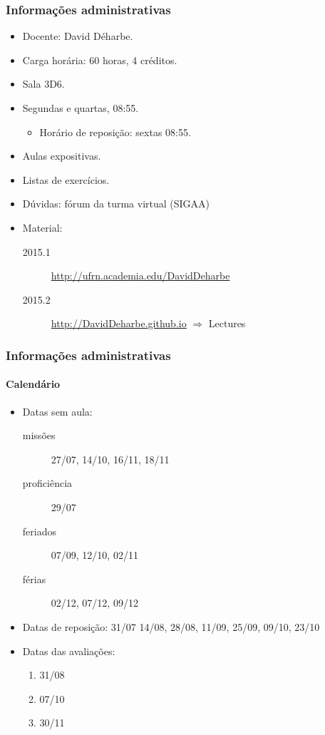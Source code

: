 \documentclass{beamer}
\begin{document}
\begin{frame}

  \frametitle{Informações administrativas}

  \begin{itemize}
    \item Docente: David Déharbe.
    \item Carga horária: 60 horas, 4 créditos.
    \item Sala 3D6.
    \item Segundas e quartas, 08:55. 
      \begin{itemize}
      \item Horário de reposição: sextas 08:55.
      \end{itemize}
    \item Aulas expositivas.
    \item Listas de exercícios.
    \item Dúvidas: fórum da turma virtual (SIGAA)
    \item Material:
      \begin{description}
      \item[2015.1] \url{http://ufrn.academia.edu/DavidDeharbe}
      \item[2015.2] \url{http://DavidDeharbe.github.io} $\Rightarrow$ Lectures
      \end{description}
  \end{itemize}
\end{frame}

\begin{frame}

  \frametitle{Informações administrativas}
  \framesubtitle{Calendário}

  \begin{itemize}

    \item Datas sem aula:
      \begin{description}
        \item[missões] 27/07, 14/10, 16/11, 18/11
        \item[proficiência] 29/07
        \item[feriados] 07/09, 12/10, 02/11
        \item[férias] 02/12, 07/12, 09/12
      \end{description}

    \item Datas de reposição: 31/07 14/08, 28/08, 11/09, 25/09, 09/10, 23/10

    \item Datas das avaliações:

      \begin{enumerate}
        \item 31/08
        \item 07/10
        \item 30/11
      \end{enumerate}
  \end{itemize}

\end{frame}
\end{document}
